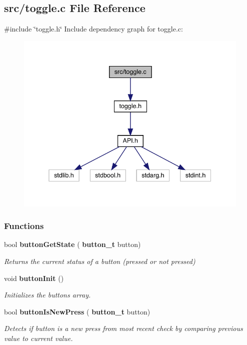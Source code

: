 \subsection{src/toggle.c File Reference}
\label{toggle_8c}
{\ttfamily \#include \char`\"{}toggle.\+h\char`\"{}}\newline
Include dependency graph for toggle.\+c\+:\nopagebreak
\begin{figure}[H]
\begin{center}
\leavevmode
\includegraphics[width=338pt]{toggle_8c__incl}
\end{center}
\end{figure}
\subsubsection*{Functions}
\begin{DoxyCompactItemize}
\item 
bool \textbf{ button\+Get\+State} (\textbf{ button\+\_\+t} button)
\begin{DoxyCompactList}\small\item\em Returns the current status of a button (pressed or not pressed) \end{DoxyCompactList}\item 
void \textbf{ button\+Init} ()
\begin{DoxyCompactList}\small\item\em Initializes the buttons array. \end{DoxyCompactList}\item 
bool \textbf{ button\+Is\+New\+Press} (\textbf{ button\+\_\+t} button)
\begin{DoxyCompactList}\small\item\em Detects if button is a new press from most recent check by comparing previous value to current value. \end{DoxyCompactList}\end{DoxyCompactItemize}
